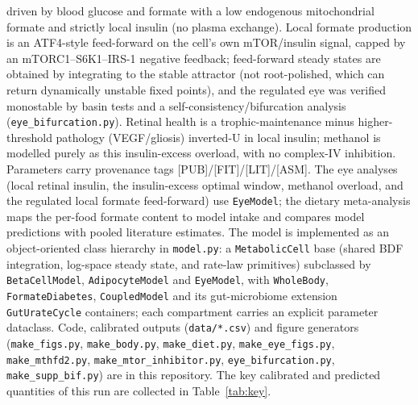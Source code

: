 \documentclass[10pt,letterpaper]{article}
\begin{document}
driven by blood glucose and formate with a low endogenous mitochondrial formate
and strictly local insulin (no plasma exchange). Local formate production is an
ATF4-style feed-forward on the cell's own mTOR/insulin signal, capped by an
mTORC1--S6K1--IRS-1 negative feedback; feed-forward steady states are obtained by
integrating to the stable attractor (not root-polished, which can return
dynamically unstable fixed points), and the regulated eye was verified monostable
by basin tests and a self-consistency/bifurcation analysis
(\texttt{eye\_bifurcation.py}). Retinal health is a trophic-maintenance minus
higher-threshold pathology (VEGF/gliosis) inverted-U in local insulin; methanol is
modelled purely as this insulin-excess overload, with no complex-IV inhibition.
Parameters carry provenance tags [PUB]/[FIT]/[LIT]/[ASM]. The eye analyses (local
retinal insulin, the insulin-excess optimal window, methanol overload, and the
regulated local formate feed-forward) use \texttt{EyeModel}; the dietary
meta-analysis maps the
per-food formate content to model intake and compares model predictions with
pooled literature estimates. The model is implemented as an object-oriented class
hierarchy in \texttt{model.py}: a \texttt{MetabolicCell} base (shared BDF
integration, log-space steady state, and rate-law primitives) subclassed by
\texttt{BetaCellModel}, \texttt{AdipocyteModel} and \texttt{EyeModel}, with
\texttt{WholeBody}, \texttt{FormateDiabetes}, \texttt{CoupledModel} and its gut-microbiome extension \texttt{GutUrateCycle} containers;
each compartment carries an explicit parameter dataclass. Code, calibrated outputs
(\texttt{data/*.csv}) and figure generators (\texttt{make\_figs.py},
\texttt{make\_body.py}, \texttt{make\_diet.py}, \texttt{make\_eye\_figs.py},
\texttt{make\_mthfd2.py}, \texttt{make\_mtor\_inhibitor.py},
\texttt{eye\_bifurcation.py}, \texttt{make\_supp\_bif.py}) are in this repository.
The key calibrated and predicted quantities of this run are collected in
Table~\ref{tab:key}.
\end{document}
